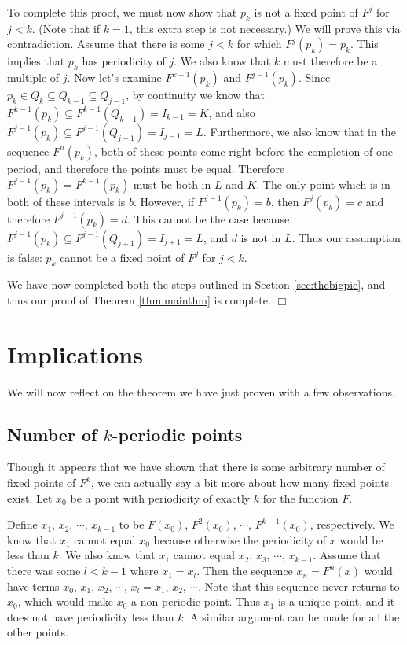 \documentclass[12pt]{IEEEtran}
\begin{document}
To complete this proof, we must now show that $p_k$ is not a fixed point of $F^j$ for $j < k$. (Note that if $k = 1$, this extra step is not necessary.) We will prove this via contradiction. Assume that there is some $j < k$ for which $F^j \left( p_k \right) = p_k$. This implies that $p_k$ has periodicity of $j$. We also know that $k$ must therefore be a multiple of $j$. Now let's examine $F^{k-1} \left( p_k \right)$ and $F^{j-1} \left( p_k \right)$. Since $p_k \in Q_k \subseteq Q_{k-1} \subseteq Q_{j-1}$, by continuity we know that $F^{k-1} \left( p_k \right) \subseteq F^{k-1} \left( Q_{k-1} \right) = I_{k-1} = K$, and also $F^{j-1} \left( p_k \right) \subseteq F^{j-1} \left( Q_{j-1} \right) = I_{j-1} = L$. Furthermore, we also know that in the sequence $F^n \left( p_k \right)$, both of these points come right before the completion of one period, and therefore the points must be equal. Therefore $F^{j-1} \left( p_k \right) = F^{k-1} \left( p_k \right)$ must be both in $L$ and $K$. The only point which is in both of these intervals is $b$. However, if $F^{j-1} \left( p_k \right) = b$, then $F^{j} \left( p_k \right) = c$ and therefore $F^{j-1} \left( p_k \right) = d$. This cannot be the case because $F^{j-1} \left( p_k \right) \subseteq F^{j-1} \left( Q_{j+1} \right) = I_{j+1} = L$, and $d$ is not in $L$. Thus our assumption is false: $p_k$ cannot be a fixed point of $F^j$ for $j < k$.

We have now completed both the steps outlined in Section \ref{sec:thebigpic}, and thus our proof of Theorem \ref{thm:mainthm} is complete. $\Box$



\section{Implications}

We will now reflect on the theorem we have just proven with a few observations.

\subsection{Number of $k$-periodic points}

Though it appears that we have shown that there is some arbitrary number of fixed points of $F^k$, we can actually say a bit more about how many fixed points exist. Let $x_0$ be a point with periodicity of exactly $k$ for the function $F$.

Define $x_1$, $x_2$, $\cdots$, $x_{k-1}$ to be $F \left( x_0 \right)$, $F^2 \left( x_0 \right)$, $\cdots$, $F^{k-1} \left( x_0 \right)$, respectively. We know that $x_1$ cannot equal $x_0$ because otherwise the periodicity of $x$ would be less than $k$. We also know that $x_1$  cannot equal $x_2$, $x_3$, $\cdots$, $x_{k-1}$. Assume that there was some $l < k-1$ where $x_1 = x_l$. Then the sequence $x_n = F^n \left( x \right)$ would have terms $x_0$, $x_1$, $x_2$, $\cdots$, $x_l = x_1$, $x_2$, $\cdots$. Note that this sequence never returns to $x_0$, which would make $x_0$ a non-periodic point. Thus $x_1$ is a unique point, and it does not have periodicity less than $k$. A similar argument can be made for all the other points.
\end{document}
